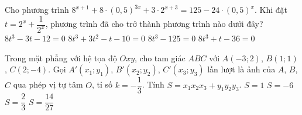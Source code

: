 \begin{ex}%
Cho phương trình $8^{x+1}+8\cdot(0{,}5)^{3x}+3\cdot 2^{x+3}=125-24\cdot (0{,}5)^x$. Khi đặt $t=2^x+\dfrac{1}{2^x}$, phương trình đã cho trở thành phương trình nào dưới đây?
\choice
{$8t^3-3t-12=0$}
{$8t^3+3t^2-t-10=0$}
{\True $8t^3-125=0$}
{ $8t^3+t-36=0$}
\end{ex}

\begin{ex}%
Trong mặt phẳng với hệ tọa độ $Oxy$, cho tam giác $ABC$ với $A(-3;2)$, $B(1;1)$, $C(2;-4)$. Gọi $A'(x_1;y_1)$, $B'(x_2;y_2)$, $C'(x_3;y_3)$ lần lượt là ảnh của $A$, $B$, $C$ qua phép vị tự tâm $O$, tỉ số $k=-\dfrac{1}{3}$. Tính $S=x_1x_2x_3+y_1y_2y_3$.
\choice
{$S=1$}
{$S=-6$}
{$S=\dfrac{2}{3}$}
{\True $S=\dfrac{14}{27}$}
\end{ex}

